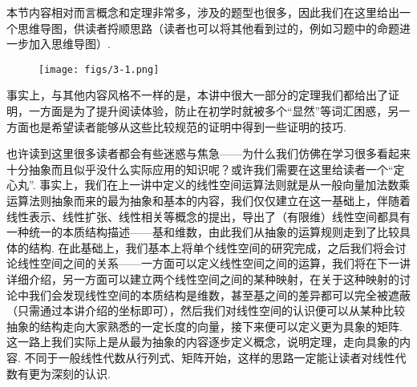 \begin{summary}

    本节内容相对而言概念和定理非常多，涉及的题型也很多，因此我们在这里给出一个思维导图，供读者捋顺思路（读者也可以将其他看到过的，例如习题中的命题进一步加入思维导图）.
    \begin{figure}[htbp]
        \centering
        \texttt{[image: figs/3-1.png]}
    \end{figure}

    事实上，与其他内容风格不一样的是，本讲中很大一部分的定理我们都给出了证明，一方面是为了提升阅读体验，防止在初学时就被多个``显然''等词汇困惑，另一方面也是希望读者能够从这些比较规范的证明中得到一些证明的技巧.

    也许读到这里很多读者都会有些迷惑与焦急——为什么我们仿佛在学习很多看起来十分抽象而且似乎没什么实际应用的知识呢？或许我们需要在这里给读者一个``定心丸''. 事实上，我们在上一讲中定义的线性空间运算法则就是从一般向量加法数乘运算法则抽象而来的最为抽象和基本的内容，我们仅仅建立在这一基础上，伴随着线性表示、线性扩张、线性相关等概念的提出，导出了（有限维）线性空间都具有一种统一的本质结构描述——基和维数，由此我们从抽象的运算规则走到了比较具体的结构. 在此基础上，我们基本上将单个线性空间的研究完成，之后我们将会讨论线性空间之间的关系——一方面可以定义线性空间之间的运算，我们将在下一讲详细介绍，另一方面可以建立两个线性空间之间的某种映射，在关于这种映射的讨论中我们会发现线性空间的本质结构是维数，甚至基之间的差异都可以完全被遮蔽（只需通过本讲介绍的坐标即可），然后我们对线性空间的认识便可以从某种比较抽象的结构走向大家熟悉的一定长度的向量，接下来便可以定义更为具象的矩阵. 这一路上我们实际上是从最为抽象的内容逐步定义概念，说明定理，走向具象的内容. 不同于一般线性代数从行列式、矩阵开始，这样的思路一定能让读者对线性代数有更为深刻的认识.

\end{summary}


